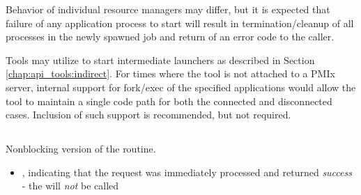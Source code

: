 \adviceuserstart
Behavior of individual resource managers may differ, but it is expected that failure of any application process to start will result in termination/cleanup of all processes in the newly spawned job and return of an error code to the caller.
\adviceuserend

\adviceimplstart
Tools may utilize  to start intermediate launchers as described in Section \ref{chap:api_tools:indirect}. For times where the tool is not attached to a \ac{PMIx} server, internal support for fork/exec of the specified applications would allow the tool to maintain a single code path for both the connected and disconnected cases. Inclusion of such support is recommended, but not required.
\adviceimplend


\subsection{}

\summary

Nonblocking version of the  routine.

\format


\begin{arglist}
\end{arglist}

\returnsimplenb

\returnstart
\begin{itemize}
    \item {}, indicating that the request was immediately processed and returned \textit{success} - the  will \textit{not} be called
\end{itemize}
\returnend

